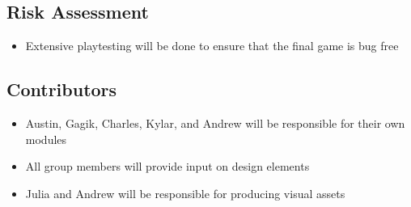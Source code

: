 \documentclass[]{article}
\begin{document}
\subsection*{Risk Assessment}
\begin{itemize}
\item Extensive playtesting will be done to ensure that the 
  final game is bug free
\end{itemize}
\subsection*{Contributors}
\begin{itemize}
\item Austin, Gagik, Charles, Kylar, and Andrew will be responsible
  for their own modules
\item All group members will provide input on design elements
\item Julia and Andrew will be responsible for producing visual assets
\end{itemize}
\end{document}

